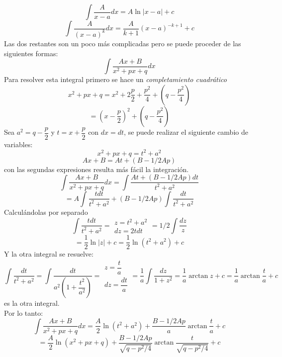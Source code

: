 \documentclass[10pt,twoside]{SelfArx} %
\begin{document}
   \begin{equation}
 	\displaystyle\int \dfrac{A}{x-a}dx=A\ln|x-a|+c
 	\end{equation}
 	\begin{equation}
 	\displaystyle\int \dfrac{A}{(x-a)^{k}}dx =\dfrac{A}{k+1}(x-a)^{-k+1}+c
 	\end{equation}
 Las dos restantes son un poco más complicadas pero se puede proceder de las siguientes formas:	
\begin{equation}
\displaystyle\int\dfrac{Ax+B}{x^{2}+px+q}dx  
\end{equation}
Para resolver esta integral primero se hace un \textsl{completamiento cuadrático}
\[ x^{2}+px+q=x^{2}+2\dfrac{p}{2}+\dfrac{p^{2}}{4}+\left (q-\dfrac{p^{2}}{4}\right ) \]
\[ =(x-\dfrac{p}{2})^{2}+(q-\dfrac{p^{2}}{4}) \]
Sea $ a^{2}=q-\dfrac{p}{2} $ y $ t=x+\dfrac{p}{2} $ con $ dx=dt $, se puede realizar el siguiente cambio de variables:
\[ x^{2}+px+q=t^{2}+a^{2} \]
\[ Ax+B=At+(B-1/2Ap) \]
con las segundas expresiones resulta más fácil la integración.
\begin{equation}
	\int \dfrac{Ax+B}{x^{2}+px+q}dx=\int \dfrac{At+(B-1/2Ap)dt}{t^{2}+a^{2}}
\end{equation}
\begin{equation}
=A\int \dfrac{tdt}{t^{2}+a^{2}}+ (B-1/2Ap)\int\dfrac{dt}{t^{2}+a^{2}}
\end{equation}
Calcul\'andolas por separado
\[ \int \dfrac{tdt}{t^{2}+a^{2}}=  \begin{array}{cc}
z=t^{2}+a^{2}\\
dz=2tdt
\end{array} 
= 1/2\int\dfrac{dz}{z}\]
\[ =\dfrac{1}{2}\ln |z|+c=\dfrac{1}{2}\ln (t^{2}+a^{2})+c \]
Y la otra integral se resuelve:
\[ \int\dfrac{dt}{t^{2}+a^{2}}=\int \dfrac{dt}{a^{2}\left (1+\dfrac{t^{2}}{a^{2}}\right )}=\begin{array}{cc}
z=\dfrac{t}{a}\\
dz=\dfrac{dt}{a}
\end{array}=\dfrac{1}{a}\int \dfrac{dz}{1+z^{2}}=\dfrac{1}{a}\arctan z+c=\dfrac{1}{a}\arctan \dfrac{t}{a}+c  \]
es la otra integral.\\
Por lo tanto:
\begin{equation}
\int \dfrac{Ax+B}{x^{2}+px+q}dx=\dfrac{A}{2}\ln (t^{2}+a^{2})+\dfrac{B-1/2Ap}{a}\arctan \dfrac{t}{a}+c
\end{equation}
\begin{equation}
=\dfrac{A}{2}\ln (x^{2}+px+q)+\dfrac{B-1/2Ap}{\sqrt{q-p^{2}/4}}\arctan \dfrac{t}{\sqrt{q-p^{2}/4}}+c
\end{equation}
\end{document}
